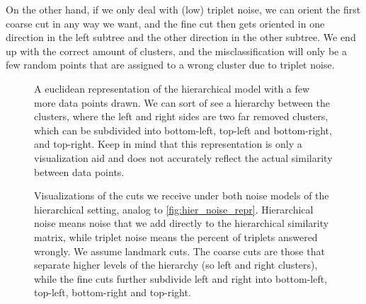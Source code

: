 On the other hand, if we only deal with (low) triplet noise, we can orient the first coarse cut in any way we want, and the fine cut then gets oriented in one direction in the left subtree
and the other direction in the other subtree. We end up with the correct amount of clusters, and the misclassification will only be a few random points that are assigned to a wrong cluster 
due to triplet noise.


\begin{figure}[ht]
    \centering
    \resizebox{0.8\textwidth}{!}{}
    \caption{
        A euclidean representation of the hierarchical model with a few more data points drawn. We can sort of see a hierarchy between the clusters, where
        the left and right sides are two far removed clusters, which can be subdivided into bottom-left, top-left and bottom-right, and top-right.
        Keep in mind that this representation is only a visualization aid and does not accurately reflect the actual similarity between data points.
    }
    \label{fig:hier_noise_repr}
\end{figure}


\begin{figure}[ht]
    \centering
    \hfill
    \caption{
        Visualizations of the cuts we receive under both noise models of the hierarchical setting, analog to \autoref{fig:hier_noise_repr}.
        Hierarchical noise means noise that we add directly to the hierarchical similarity matrix, while triplet noise means the 
        percent of triplets answered wrongly. We assume landmark cuts. The coarse cuts are those that separate higher levels of the hierarchy (so left and right clusters), while
        the fine cuts further subdivide left and right into bottom-left, top-left, bottom-right and top-right.
    }
    \label{fig:hier_noise_cuts}
\end{figure}

